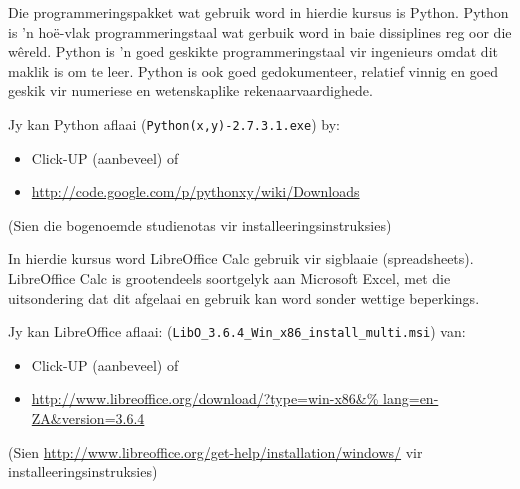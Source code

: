 	Die programmeringspakket wat gebruik word in hierdie kursus is Python.
	Python is 'n ho\"{e}-vlak programmeringstaal wat gerbuik word in baie
	dissiplines reg oor die w\^{e}reld. Python is 'n goed geskikte programmeringstaal 
	vir ingenieurs omdat dit maklik is om te leer.
	Python is ook goed gedokumenteer, relatief vinnig en goed geskik vir numeriese 
	en wetenskaplike rekenaarvaardighede.
        
        Jy kan Python aflaai ({\tt Python(x,y)-2.7.3.1.exe}) by:
        \begin{itemize}
            \item Click-UP (aanbeveel) of
            \item \url{http://code.google.com/p/pythonxy/wiki/Downloads}
        \end{itemize}
        (Sien die bogenoemde studienotas vir installeeringsinstruksies)

	In hierdie kursus word LibreOffice Calc gebruik vir sigblaaie (spreadsheets).
	LibreOffice Calc is grootendeels soortgelyk aan Microsoft Excel, met die
	uitsondering dat dit afgelaai en gebruik kan word sonder wettige
	beperkings.
        
        Jy kan LibreOffice aflaai:
        ({\tt LibO\_3.6.4\_Win\_x86\_install\_multi.msi}) van:
        \begin{itemize}
            \item Click-UP (aanbeveel) of
            \item \url{http://www.libreoffice.org/download/?type=win-x86&%
                       lang=en-ZA&version=3.6.4}
        \end{itemize}
        (Sien \url{http://www.libreoffice.org/get-help/installation/windows/} vir 
        installeeringsinstruksies)
